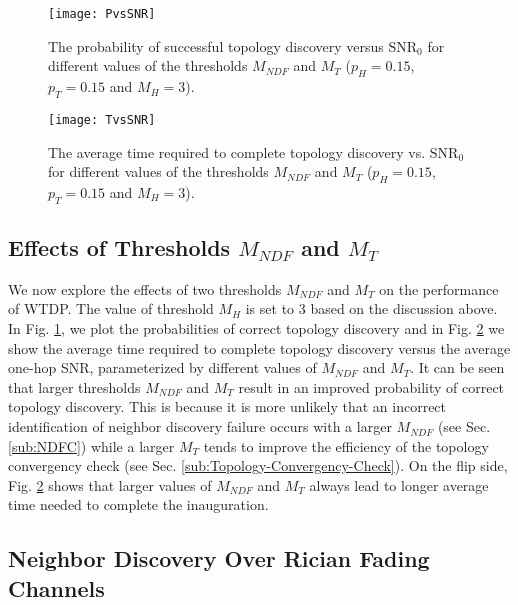 \documentclass[10pt,english,two column]{IEEEtran}
\begin{document}
\begin{figure}[h]
\begin{centering}
\textsf{\texttt{[image: PvsSNR]}}
\par\end{centering}

\caption{\label{fig: PvsSNR}The probability of successful topology discovery
versus $\mathrm{SN}\mathrm{R}_{0}$ for different values of the thresholds
$M_{NDF}$ and $M_{T}$ ($p_{H}=0.15$, $p_{T}=0.15$ and $M_{H}=3$).}
\end{figure}
\begin{figure}[h]
\begin{centering}
\textsf{\texttt{[image: TvsSNR]}}
\par\end{centering}

\caption{\label{fig:TvsSNR}The average time required to complete topology
discovery vs. $\mathrm{SNR}_{0}$ for different values of the thresholds
$M_{NDF}$ and $M_{T}$ ($p_{H}=0.15$, $p_{T}=0.15$ and $M_{H}=3$).}
\end{figure}



\subsection{Effects of Thresholds $M_{NDF}$ and $M_{T}$ }

We now explore the effects of two thresholds $M_{NDF}$ and $M_{T}$
on the performance of WTDP. The value of threshold $M_{H}$ is set
to 3 based on the discussion above. In Fig. \ref{fig: PvsSNR}, we
plot the probabilities of correct topology discovery and in Fig. \ref{fig:TvsSNR}
we show the average time required to complete topology discovery versus
the average one-hop SNR, parameterized by different values of $M_{NDF}$
and $M_{T}$. It can be seen that larger thresholds $M_{NDF}$ and
$M_{T}$ result in an improved probability of correct topology discovery.
This is because it is more unlikely that an incorrect identification
of neighbor discovery failure occurs with a larger $M_{NDF}$ (see
Sec. \ref{sub:NDFC}) while a larger $M_{T}$ tends to improve the
efficiency of the topology convergency check (see Sec. \ref{sub:Topology-Convergency-Check}).
On the flip side, Fig. \ref{fig:TvsSNR} shows that larger values
of $M_{NDF}$ and $M_{T}$ always lead to longer average time needed
to complete the inauguration. 


\subsection{Neighbor Discovery Over Rician Fading Channels\label{sub:Neighbor-Discovery-Over}}
\end{document}

